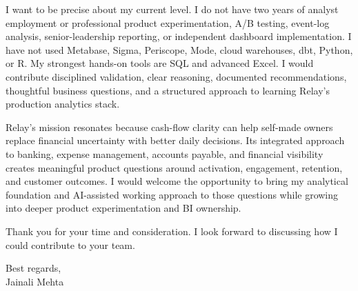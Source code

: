 \documentclass[letterpaper,10pt]{article}
\begin{document}
I want to be precise about my current level. I do not have two years of analyst employment or professional product experimentation, A/B testing, event-log analysis, senior-leadership reporting, or independent dashboard implementation. I have not used Metabase, Sigma, Periscope, Mode, cloud warehouses, dbt, Python, or R. My strongest hands-on tools are SQL and advanced Excel. I would contribute disciplined validation, clear reasoning, documented recommendations, thoughtful business questions, and a structured approach to learning Relay's production analytics stack.

Relay's mission resonates because cash-flow clarity can help self-made owners replace financial uncertainty with better daily decisions. Its integrated approach to banking, expense management, accounts payable, and financial visibility creates meaningful product questions around activation, engagement, retention, and customer outcomes. I would welcome the opportunity to bring my analytical foundation and AI-assisted working approach to those questions while growing into deeper product experimentation and BI ownership.

Thank you for your time and consideration. I look forward to discussing how I could contribute to your team.

Best regards,\\[8pt]
Jainali Mehta
\end{document}
